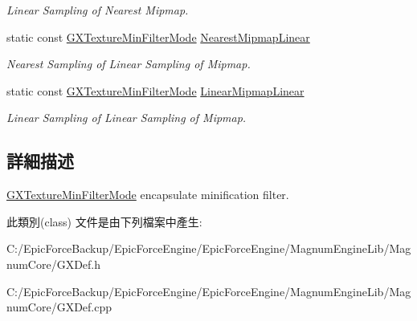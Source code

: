\begin{DoxyCompactItemize}
\begin{DoxyCompactList}\small\item\em Linear Sampling of Nearest Mipmap. \end{DoxyCompactList}\item 
static const \hyperlink{class_magnum_1_1_g_x_texture_min_filter_mode}{G\+X\+Texture\+Min\+Filter\+Mode} \hyperlink{class_magnum_1_1_g_x_texture_min_filter_mode_a3f322dc9f0d58091b4de77097b27f33e}{Nearest\+Mipmap\+Linear}\hypertarget{class_magnum_1_1_g_x_texture_min_filter_mode_a3f322dc9f0d58091b4de77097b27f33e}{}\label{class_magnum_1_1_g_x_texture_min_filter_mode_a3f322dc9f0d58091b4de77097b27f33e}

\begin{DoxyCompactList}\small\item\em Nearest Sampling of Linear Sampling of Mipmap. \end{DoxyCompactList}\item 
static const \hyperlink{class_magnum_1_1_g_x_texture_min_filter_mode}{G\+X\+Texture\+Min\+Filter\+Mode} \hyperlink{class_magnum_1_1_g_x_texture_min_filter_mode_a5288cd4dc1868980f1cdbd9af3271310}{Linear\+Mipmap\+Linear}\hypertarget{class_magnum_1_1_g_x_texture_min_filter_mode_a5288cd4dc1868980f1cdbd9af3271310}{}\label{class_magnum_1_1_g_x_texture_min_filter_mode_a5288cd4dc1868980f1cdbd9af3271310}

\begin{DoxyCompactList}\small\item\em Linear Sampling of Linear Sampling of Mipmap. \end{DoxyCompactList}\end{DoxyCompactItemize}


\subsection{詳細描述}
\hyperlink{class_magnum_1_1_g_x_texture_min_filter_mode}{G\+X\+Texture\+Min\+Filter\+Mode} encapsulate minification filter. 

此類別(class) 文件是由下列檔案中產生\+:\begin{DoxyCompactItemize}
\item 
C\+:/\+Epic\+Force\+Backup/\+Epic\+Force\+Engine/\+Epic\+Force\+Engine/\+Magnum\+Engine\+Lib/\+Magnum\+Core/G\+X\+Def.\+h\item 
C\+:/\+Epic\+Force\+Backup/\+Epic\+Force\+Engine/\+Epic\+Force\+Engine/\+Magnum\+Engine\+Lib/\+Magnum\+Core/G\+X\+Def.\+cpp\end{DoxyCompactItemize}
